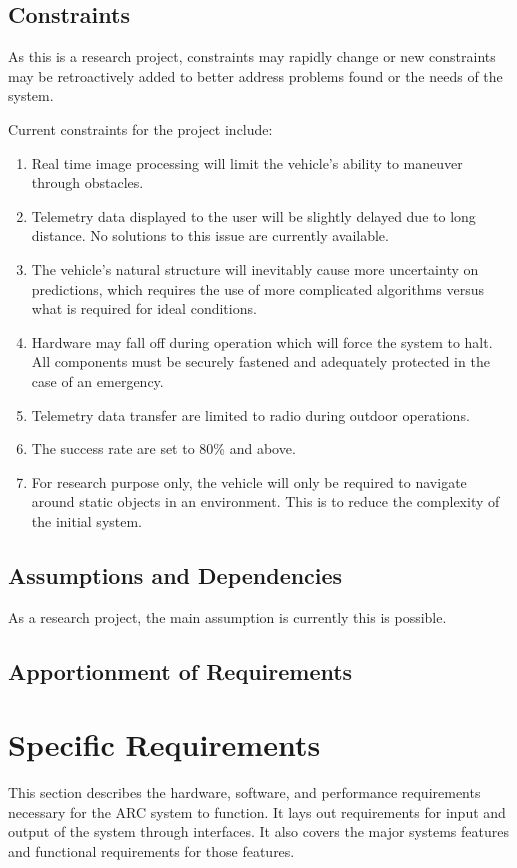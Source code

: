 \documentclass[compsoc,draftclsnofoot,onecolumn,10pt]{IEEEtran}
\begin{document}
\subsection{Constraints} %
As this is a research project, constraints may rapidly change or new constraints may be retroactively added to better address problems found or the needs of the system. \par
Current constraints for the project include: 
\begin{enumerate}
	\item Real time image processing will limit the vehicle's ability to maneuver through obstacles. 
	\item Telemetry data displayed to the user will be slightly delayed due to long distance. 
	No solutions to this issue are currently available.
	\item The vehicle's natural structure will inevitably cause more uncertainty on predictions, which requires the use of more complicated algorithms versus what is required for ideal conditions.
	\item Hardware may fall off during operation which will force the system to halt. 
	All components must be securely fastened and adequately protected in the case of an emergency.  
	\item Telemetry data transfer are limited to radio during outdoor operations.
	\item The success rate are set to 80\% and above.
	\item For research purpose only, the vehicle will only be required to navigate around static objects in an environment. 
	This is to reduce the complexity of the initial system. 
\end{enumerate}

\subsection{Assumptions and Dependencies}
As a research project, the main assumption is currently this is possible. 

\subsection{Apportionment of Requirements} %



\section{Specific Requirements} %
This section describes the hardware, software, and performance requirements
necessary for the ARC system to function. It lays out requirements for
input and output of the system through interfaces. It also covers the major
systems features and functional requirements for those features.
\end{document}
